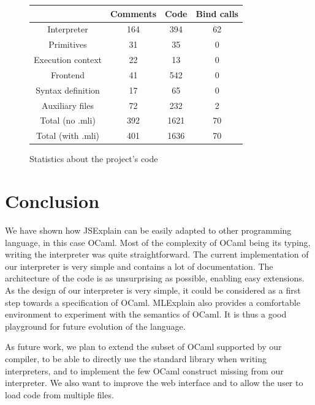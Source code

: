 \documentclass[twocolumn,a4paper]{article}
\begin{document}
\begin{figure}
  \begin{tabular}{| c | c | c | c |}
    \hline
    & Comments & Code & Bind calls \\
    \hline
    Interpreter & 164 & 394 & 62 \\
    Primitives & 31 & 35 & 0 \\
    Execution context & 22 & 13 & 0 \\
    Frontend & 41 & 542 & 0 \\
    Syntax definition & 17 & 65 & 0 \\
    Auxiliary files & 72 & 232 & 2 \\
    \hline
    Total (no .mli) & 392 & 1621 & 70 \\
    Total (with .mli) & 401 & 1636 & 70 \\
    \hline
  \end{tabular}

  \centering
  \caption{Statistics about the project's code}
  \label{fig:statistics}
\end{figure}

\section{Conclusion}
We have shown how JSExplain can be easily adapted to other programming language,
in this case OCaml. Most of the complexity of OCaml being its typing, writing
the interpreter was quite straightforward. The current implementation of our
interpreter is very simple and contains a lot of documentation. The architecture
of the code is as unsurprising as possible, enabling easy extensions. As the
design of our interpreter is very simple, it could be considered as a first step
towards a specification of OCaml. MLExplain also provides a comfortable
environment to experiment with the semantics of OCaml. It is thus a good
playground for future evolution of the language.

As future work, we plan to extend the subset of OCaml supported by our compiler,
to be able to directly use the standard library when writing interpreters, and
to implement the few OCaml construct missing from our interpreter. We also want
to improve the web interface and to allow the user to load code from multiple files.



\end{document}
